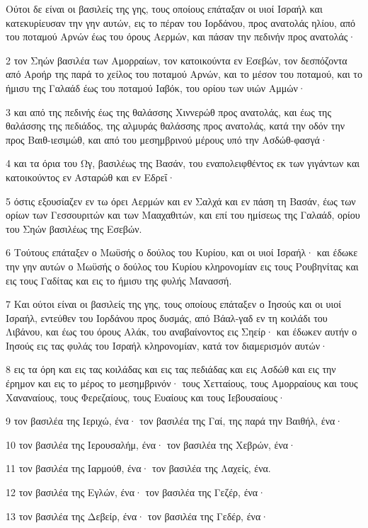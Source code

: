 \par Ούτοι δε είναι οι βασιλείς της γης, τους οποίους επάταξαν οι υιοί Ισραήλ και κατεκυρίευσαν την γην αυτών, εις το πέραν του Ιορδάνου, προς ανατολάς ηλίου, από του ποταμού Αρνών έως του όρους Αερμών, και πάσαν την πεδινήν προς ανατολάς·
\par 2 τον Σηών βασιλέα των Αμορραίων, τον κατοικούντα εν Εσεβών, τον δεσπόζοντα από Αροήρ της παρά το χείλος του ποταμού Αρνών, και το μέσον του ποταμού, και το ήμισυ της Γαλαάδ έως του ποταμού Ιαβόκ, του ορίου των υιών Αμμών·
\par 3 και από της πεδινής έως της θαλάσσης Χιννερώθ προς ανατολάς, και έως της θαλάσσης της πεδιάδος, της αλμυράς θαλάσσης προς ανατολάς, κατά την οδόν την προς Βαιθ-ιεσιμώθ, και από του μεσημβρινού μέρους υπό την Ασδώθ-φασγά·
\par 4 και τα όρια του Ωγ, βασιλέως της Βασάν, του εναπολειφθέντος εκ των γιγάντων και κατοικούντος εν Ασταρώθ και εν Εδρεΐ·
\par 5 όστις εξουσίαζεν εν τω όρει Αερμών και εν Σαλχά και εν πάση τη Βασάν, έως των ορίων των Γεσσουριτών και των Μααχαθιτών, και επί του ημίσεως της Γαλαάδ, ορίου του Σηών βασιλέως της Εσεβών.
\par 6 Τούτους επάταξεν ο Μωϋσής ο δούλος του Κυρίου, και οι υιοί Ισραήλ· και έδωκε την γην αυτών ο Μωϋσής ο δούλος του Κυρίου κληρονομίαν εις τους Ρουβηνίτας και εις τους Γαδίτας και εις το ήμισυ της φυλής Μανασσή.
\par 7 Και ούτοι είναι οι βασιλείς της γης, τους οποίους επάταξεν ο Ιησούς και οι υιοί Ισραήλ, εντεύθεν του Ιορδάνου προς δυσμάς, από Βάαλ-γαδ εν τη κοιλάδι του Λιβάνου, και έως του όρους Αλάκ, του αναβαίνοντος εις Σηείρ· και έδωκεν αυτήν ο Ιησούς εις τας φυλάς του Ισραήλ κληρονομίαν, κατά τον διαμερισμόν αυτών·
\par 8 εις τα όρη και εις τας κοιλάδας και εις τας πεδιάδας και εις Ασδώθ και εις την έρημον και εις το μέρος το μεσημβρινόν· τους Χετταίους, τους Αμορραίους και τους Χαναναίους, τους Φερεζαίους, τους Ευαίους και τους Ιεβουσαίους·
\par 9 τον βασιλέα της Ιεριχώ, ένα· τον βασιλέα της Γαί, της παρά την Βαιθήλ, ένα·
\par 10 τον βασιλέα της Ιερουσαλήμ, ένα· τον βασιλέα της Χεβρών, ένα·
\par 11 τον βασιλέα της Ιαρμούθ, ένα· τον βασιλέα της Λαχείς, ένα.
\par 12 τον βασιλέα της Εγλών, ένα· τον βασιλέα της Γεζέρ, ένα·
\par 13 τον βασιλέα της Δεβείρ, ένα· τον βασιλέα της Γεδέρ, ένα·
